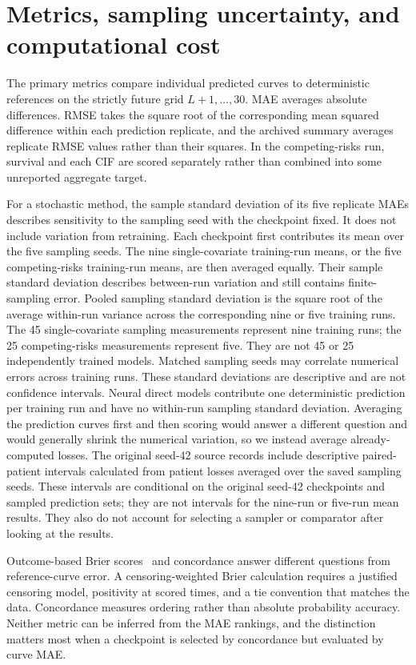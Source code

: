 \section{Metrics, sampling uncertainty, and computational cost}\label{supp:metrics}
The primary metrics compare individual predicted curves to deterministic references on the strictly future grid $L+1,\ldots,30$. MAE averages absolute differences. RMSE takes the square root of the corresponding mean squared difference within each prediction replicate, and the archived summary averages replicate RMSE values rather than their squares. In the competing-risks run, survival and each CIF are scored separately rather than combined into some unreported aggregate target.

For a stochastic method, the sample standard deviation of its five replicate MAEs describes sensitivity to the sampling seed with the checkpoint fixed. It does not include variation from retraining. Each checkpoint first contributes its mean over the five sampling seeds. The nine single-covariate training-run means, or the five competing-risks training-run means, are then averaged equally. Their sample standard deviation describes between-run variation and still contains finite-sampling error. Pooled sampling standard deviation is the square root of the average within-run variance across the corresponding nine or five training runs. The 45 single-covariate sampling measurements represent nine training runs; the 25 competing-risks measurements represent five. They are not 45 or 25 independently trained models. Matched sampling seeds may correlate numerical errors across training runs. These standard deviations are descriptive and are not confidence intervals. Neural direct models contribute one deterministic prediction per training run and have no within-run sampling standard deviation. Averaging the prediction curves first and then scoring would answer a different question and would generally shrink the numerical variation, so we instead average already-computed losses. The original seed-42 source records include descriptive paired-patient intervals calculated from patient losses averaged over the saved sampling seeds. These intervals are conditional on the original seed-42 checkpoints and sampled prediction sets; they are not intervals for the nine-run or five-run mean results. They also do not account for selecting a sampler or comparator after looking at the results.

Outcome-based Brier scores~\citep{graf1999} and concordance answer different questions from reference-curve error. A censoring-weighted Brier calculation requires a justified censoring model, positivity at scored times, and a tie convention that matches the data. Concordance measures ordering rather than absolute probability accuracy. Neither metric can be inferred from the MAE rankings, and the distinction matters most when a checkpoint is selected by concordance but evaluated by curve MAE.

